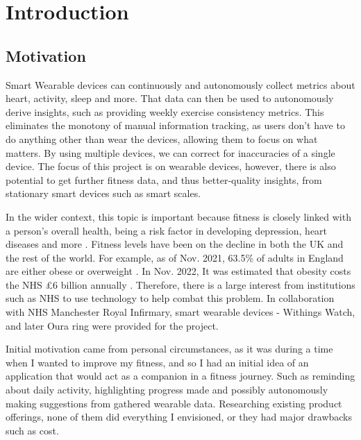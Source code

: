 \chapter{Introduction}
\label{cha:intro}

\section{Motivation}

Smart Wearable devices can continuously and autonomously collect metrics about heart, activity, 
sleep and more. That data can then be used to autonomously derive insights, such as providing weekly exercise consistency metrics. 
This eliminates the monotony of manual information tracking, as users don't have to do anything other than wear the devices,
 allowing them to focus on what matters. By using multiple devices, we can correct for inaccuracies of a single device. 
 The focus of this project is on wearable devices, however, there is also potential to get further fitness data, and thus better-quality insights, from stationary smart devices such as smart scales.

In the wider context, this topic is important because fitness is closely linked with a person's overall health, being a risk factor in developing depression, heart diseases and more \cite{nhsObesity}. 
Fitness levels have been on the decline in both the UK and the rest of the world.
For example, as of Nov. 2021, 63.5\% of adults in England are either obese or overweight \cite{ukObesity2023Survey}. 
In Nov. 2022, It was estimated that obesity costs the NHS £6 billion annually \cite{nhsObesityCost}.
Therefore, there is a large interest from institutions such as NHS to use technology to help combat this problem. In collaboration with NHS Manchester Royal Infirmary, smart wearable devices - Withings Watch,
and later Oura ring were provided for the project.


Initial motivation came from personal circumstances, as it was during a time when I wanted to improve my fitness, and so I had an initial idea of an
application that would act as a companion in a fitness journey. Such as reminding about daily activity, highlighting progress made and
possibly autonomously making suggestions from gathered wearable data. Researching existing product offerings, none of them 
did everything I envisioned, or they had major drawbacks such as cost.

